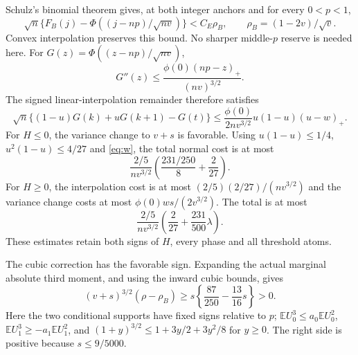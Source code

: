\documentclass[11pt]{article}
\newcommand{\E}{\mathbb E}\newcommand{\Pp}{\mathbb P}
\begin{document}
Schulz's binomial theorem \cite[Theorem1, printed p.1]{Schulz} gives,
at both integer anchors and for every $0<p<1$,
\[
 \sqrt n\{F_B(j)-\Phi((j-np)/\sqrt{nv})\}<C_E\rho_B,
 \qquad \rho_B=(1-2v)/\sqrt v.
\]
Convex interpolation preserves this bound. No sharper middle-$p$ reserve
is needed here. For $G(z)=\Phi((z-np)/\sqrt{nv})$,
\[
 G''(z)\le\frac{\phi(0)(np-z)_+}{(nv)^{3/2}}.
\]
The signed linear-interpolation remainder therefore satisfies
\[
 \sqrt n\{(1-u)G(k)+uG(k+1)-G(t)\}
 \le\frac{\phi(0)}{2nv^{3/2}}u(1-u)(u-w)_+.
\]
For $H\le0$, the variance change to $v+s$ is favorable. Using
$u(1-u)\le1/4$, $u^2(1-u)\le4/27$ and \eqref{eq:w}, the total
normal cost is at most
\[
 \frac{2/5}{nv^{3/2}}\left(\frac{231/250}{8}+\frac2{27}\right).
\]
For $H\ge0$, the interpolation cost is at most
$(2/5)(2/27)/(nv^{3/2})$ and the variance change costs at most
$\phi(0)ws/(2v^{3/2})$. The total is at most
\[
 \frac{2/5}{nv^{3/2}}\left(\frac2{27}+\frac{231}{500}\lambda\right).
\]
These estimates retain both signs of $H$, every phase and all threshold atoms.

The cubic correction has the favorable sign. Expanding the actual marginal
absolute third moment, and using the inward cubic bounds, gives
\[
 (v+s)^{3/2}(\rho-\rho_B)
 \ge s\left\{\frac{87}{250}-\frac{13}{16}s\right\}>0.
\]
Here the two conditional supports have fixed signs relative to $p$;
$\E U_0^3\le a_0\E U_0^2$, $\E U_1^3\ge-a_1\E U_1^2$,
and $(1+y)^{3/2}\le1+3y/2+3y^2/8$ for $y\ge0$.
The right side is positive because $s\le9/5000$.
\end{document}
